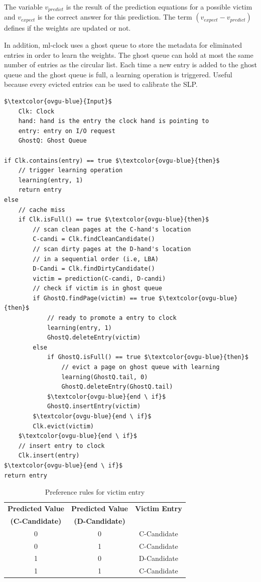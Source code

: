 \documentclass[
	12pt,
	a4paper,
	abstract,
	bibliography=totoc,
	chapterprefix,
	headings=openright,
	numbers=endperiod,
	parskip=half,
	twoside,
]{scrreprt}
\begin{document}
The variable $v_{predict}$ is the result of the prediction equations for a possible victim and 
$v_{expect}$ is the correct answer for this prediction.
The term $(v_{expect} - v_{predict})$ defines if the weights are updated or not.

In addition, ml-clock uses a ghost queue to store the metadata for eliminated entries in order to learn the weights.
The ghost queue can hold at most the same number of entries as the circular list.
Each time a new entry is added to the ghost queue and the ghost queue is full, a learning operation is triggered.
Useful because every evicted entries can be used to calibrate the SLP.

\newpage
\begin{lstlisting}[mathescape=true,caption=K-Clock replacement algorithm in pseudocode,label=lst:ml-clock-algorithm]
$\textcolor{ovgu-blue}{Input}$
	Clk: Clock
	hand: hand is the entry the clock hand is pointing to
	entry: entry on I/O request
	GhostQ: Ghost Queue

if Clk.contains(entry) == true $\textcolor{ovgu-blue}{then}$
	// trigger learning operation
	learning(entry, 1)
	return entry
else
	// cache miss
	if Clk.isFull() == true $\textcolor{ovgu-blue}{then}$
		// scan clean pages at the C-hand's location
		C-candi = Clk.findCleanCandidate()
		// scan dirty pages at the D-hand's location
		// in a sequential order (i.e, LBA)
		D-Candi = Clk.findDirtyCandidate()
		victim = prediction(C-candi, D-candi)
		// check if victim is in ghost queue
		if GhostQ.findPage(victim) == true $\textcolor{ovgu-blue}{then}$
			// ready to promote a entry to clock
			learning(entry, 1)
			GhostQ.deleteEntry(victim)
		else
			if GhostQ.isFull() == true $\textcolor{ovgu-blue}{then}$
				// evict a page on ghost queue with learning
				learning(GhostQ.tail, 0)
				GhostQ.deleteEntry(GhostQ.tail)
			$\textcolor{ovgu-blue}{end \ if}$
			GhostQ.insertEntry(victim)
		$\textcolor{ovgu-blue}{end \ if}$
		Clk.evict(victim)
	$\textcolor{ovgu-blue}{end \ if}$
	// insert entry to clock
	Clk.insert(entry)
$\textcolor{ovgu-blue}{end \ if}$
return entry 
\end{lstlisting}

\begin{table}[ht]
	\centering
	\begin{tabular}{|c|c|c|}
		\hline
		\textbf{Predicted Value} & \textbf{Predicted Value} & \textbf{Victim Entry} \\
		\textbf{(C-Candidate)} & \textbf{(D-Candidate)} & \\
		\hline
		0 & 0 & C-Candidate \\
		\hline
		0 & 1 & C-Candidate \\
		\hline
		1 & 0 & D-Candidate \\
		\hline
		1 & 1 & C-Candidate \\
		\hline
	\end{tabular}
	\caption{Preference rules for victim entry}
	\label{tab:ml-clock preference rules}
\end{table}
\end{document}

